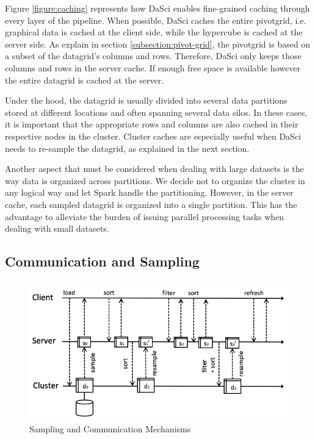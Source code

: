 \documentclass[10pt, a4paper, twocolumn]{article} %
\begin{document}
Figure \ref{figure:caching} represents how DaSci enables fine-grained caching through every layer of the pipeline.
When possible, DaSci caches the entire pivotgrid, i.e. graphical data is cached at the client side, while the hypercube is cached at the server side.
As explain in section \ref{subsection:pivot-grid}, the pivotgrid is based on a subset of the datagrid's columns and rows.
Therefore, DaSci only keeps those columns and rows in the server cache.
If enough free space is available however the entire datagrid is cached at the server.

Under the hood, the datagrid is usually divided into several data partitions stored at different locations and often spanning several data silos. In these cases, it is important that the appropriate rows and columns are also cached in their respective nodes in the cluster. 
Cluster caches are especially useful when DaSci needs to re-sample the datagrid, as explained in the next section.

Another aspect that must be considered when dealing with large datasets is the way data is organized across partitions. We decide not to organize the cluster in any logical way and let Spark handle the partitioning. However, in the server cache, each sampled datagrid is organized into a single partition. This has the advantage to alleviate the burden of issuing parallel processing tasks when dealing with small datasets.


\subsection{Communication and Sampling}
\label{subsection:communication}


\begin{figure}
	\centering
	\includegraphics[scale=0.35]{images/communication.png}
	\caption{Sampling  and Communication Mechanisms}
	\label{figure:communication}
\end{figure}
\end{document}
